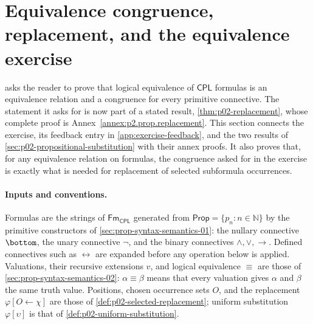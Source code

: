 \section{Equivalence congruence, replacement, and the equivalence exercise}
\label{sec:p02-w02-p02-003-exercise-link}

 asks the reader to prove that logical
equivalence of \(\mathsf{CPL}\) formulas is an equivalence relation and a
congruence for every primitive connective.  The statement it asks for is now
part of a stated result, \cref{thm:p02-replacement}, whose complete proof is
Annex~\ref{annex:p2.prop.replacement}.  This section connects the exercise,
its feedback entry in \cref{app:exercise-feedback}, and the two results of
\cref{sec:p02-propositional-substitution} with their annex proofs.  It also
proves that, for any equivalence relation on formulas, the congruence asked
for in the exercise is exactly what is needed for replacement of selected
subformula occurrences.

\paragraph{Inputs and conventions.}
Formulas are the strings of \(\mathsf{Fm}_{\mathsf{CPL}}\) generated from
\(\mathsf{Prop}=\{p_n:n\in\mathbb N\}\) by the primitive constructors of
\cref{sec:prop-syntax-semantics-01}: the nullary connective \(\bottom\), the
unary connective \(\neg\), and the binary connectives \(\land,\lor,\to\).
Defined connectives such as \(\leftrightarrow\) are expanded before any
operation below is applied.  Valuations, their recursive extensions
\(\widehat v\), and logical equivalence \(\equiv\) are those of
\cref{sec:prop-syntax-semantics-02}: \(\alpha\equiv\beta\) means that every
valuation gives \(\alpha\) and \(\beta\) the same truth value.  Positions,
chosen occurrence sets \(O\), and the replacement \(\varphi[O\leftarrow\chi]\)
are those of \cref{def:p02-selected-replacement}; uniform substitution
\(\varphi[\upsilon]\) is that of \cref{def:p02-uniform-substitution}.

